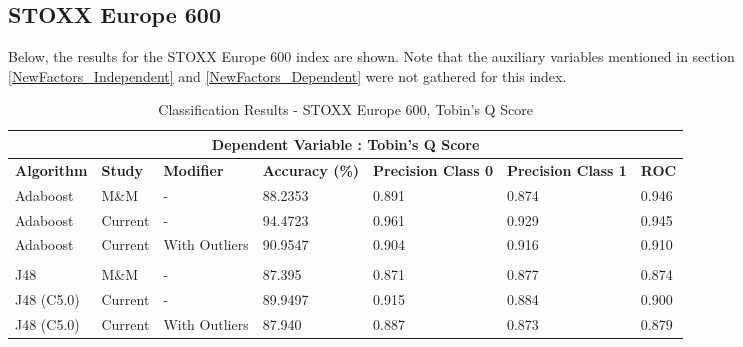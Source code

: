 \subsection*{STOXX Europe 600}
{Below, the results for the STOXX Europe 600 index are shown. Note that the auxiliary variables mentioned in section \ref{NewFactors_Independent} and \ref{NewFactors_Dependent} were not gathered for this index. }
\begin{table}[h!]
\centering
\begin{sideways}%
\begin{tabular}{ |p{2.2cm}|p{1.55cm}|p{2.8cm}||p{2cm}|p{1.8cm}|p{1.8cm}|p{1cm}|  }
 \hline
 \multicolumn{7}{|c|}{\bf Dependent Variable : Tobin's Q Score} \\
 \hline
 {\bf Algorithm} & {\bf Study} & {\bf Modifier} & {\bf Accuracy (\%)} & {\bf Precision Class 0} & {\bf Precision Class 1} & {\bf ROC} \\
 \hline
  Adaboost  & M\&M & - & 88.2353     & 0.891 &  0.874 & 0.946  \\
  \rowcolor{gray}Adaboost & Current & - &94.4723  & 0.961 & 0.929 & 0.945 \\
  Adaboost & Current & With Outliers &90.9547 & 0.904 & 0.916  & 0.910  \\
 & & & & & & \\
 \rowcolor{gray}J48  & M\&M & - &87.395  & 0.871 &  0.877 & 0.874  \\
  J48 (C5.0) & Current & - &89.9497  & 0.915 & 0.884 & 0.900 \\
 \rowcolor{gray}J48 (C5.0)  & Current & With Outliers &87.940 & 0.887 &  0.873 &  0.879 \\
 \hline
\end{tabular}
\end{sideways}
\caption{Classification Results - STOXX Europe 600, Tobin's Q Score}
\end{table}

